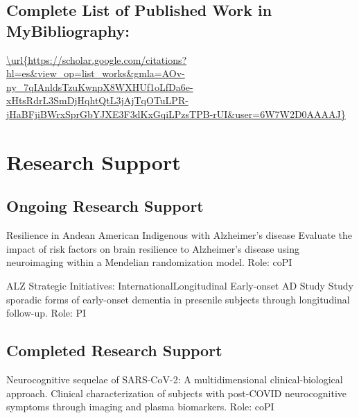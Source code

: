 \documentclass{nihbiosketch}
\begin{document}
  \subsection*{Complete List of Published Work in MyBibliography:} 
  \url{\url{https://scholar.google.com/citations?hl=es\&view_op=list_works\&gmla=AOv-ny_7qIAnldsTzuKwnpX8WXHUf1oLfDa6e-xHtsRdrL3SmDjHqhtQtL3jAjTqOTuLPR-jHaBFjiBWrxSprGbYJXE3F3dKxGqiLPzsTPB-rUI\&user=6W7W2D0AAAAJ}}
 

  \section{Research Support}
  
        \subsection*{Ongoing Research Support}
    
            
      {Resilience in Andean American Indigenous with Alzheimer's
disease}
      {Evaluate the impact of risk factors on brain resilience to
Alzheimer's disease using neuroimaging within a Mendelian randomization
model.}
      {Role: coPI}
      
      \bigskip
            
      {ALZ Strategic Initiatives: InternationalLongitudinal Early-onset
AD Study}
      {Study sporadic forms of early-onset dementia in presenile
subjects through longitudinal follow-up.}
      {Role: PI}
      
      \bigskip
          
      
  
    \subsection*{Completed Research Support}
  
          
      {Neurocognitive sequelae of SARS-CoV-2: A multidimensional
clinical-biological approach.}
      {Clinical characterization of subjects with post-COVID
neurocognitive symptoms through imaging and plasma biomarkers.}
      {Role: coPI}
      
      \bigskip
      
  
\end{document}
